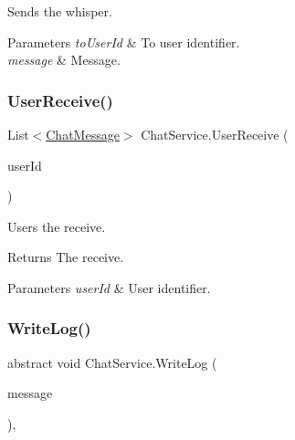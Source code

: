 Sends the whisper. 


\begin{DoxyParams}{Parameters}
{\em to\+User\+Id} & To user identifier.\\
\hline
{\em message} & Message.\\
\hline
\end{DoxyParams}
\mbox{\label{class_chat_service_a68d1993d7a034e9f999e0d3c8d51c00c}} 
\subsubsection{\texorpdfstring{User\+Receive()}{UserReceive()}}
{\footnotesize\ttfamily List$<$\mbox{\hyperlink{class_t_net_1_1_model_1_1_chat_message}{Chat\+Message}}$>$ Chat\+Service.\+User\+Receive (\begin{DoxyParamCaption}\item[{int}]{user\+Id }\end{DoxyParamCaption})}



Users the receive. 

\begin{DoxyReturn}{Returns}
The receive.
\end{DoxyReturn}

\begin{DoxyParams}{Parameters}
{\em user\+Id} & User identifier.\\
\hline
\end{DoxyParams}
\mbox{\label{class_chat_service_a906fad4202a26ffa55febf4a5fd6dd7e}} 
\subsubsection{\texorpdfstring{Write\+Log()}{WriteLog()}}
{\footnotesize\ttfamily abstract void Chat\+Service.\+Write\+Log (\begin{DoxyParamCaption}\item[{\mbox{\hyperlink{class_t_net_1_1_model_1_1_chat_message}{Chat\+Message}}}]{message }\end{DoxyParamCaption})\hspace{0.3cm}{\ttfamily [protected]}, {}}



